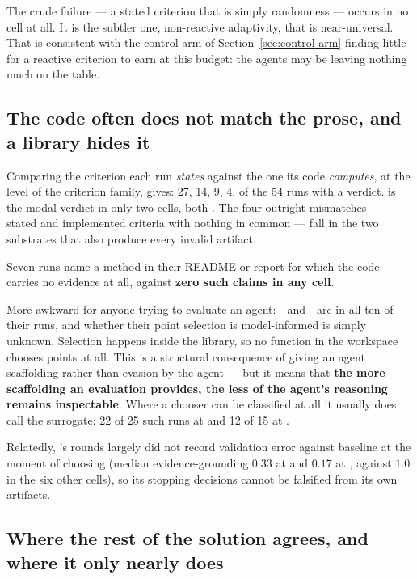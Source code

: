 The crude failure --- a stated criterion that is simply randomness --- occurs in
no cell at all. It is the subtler one, non-reactive adaptivity, that is
near-universal. That is consistent with the control arm of
Section~\ref{sec:control-arm} finding little for a reactive criterion to earn at
this budget: the agents may be leaving nothing much on the table.

\subsection{The code often does not match the prose, and a library hides it}

Comparing the criterion each run \emph{states} against the one its code
\emph{computes}, at the level of the criterion family, gives:  27,
 14,  9,  4, of the 54
runs with a verdict.  is the modal verdict in only two cells, both
\Lthree{}. The four outright mismatches --- stated and implemented criteria with
nothing in common --- fall in the two substrates that also produce every invalid
artifact.

Seven \Ltwo{} runs name a method in their README or report for which the code
carries no evidence at all, against \textbf{zero such claims in any \Lthree{}
cell}.

More awkward for anyone trying to evaluate an agent: \Ltwo{}- and
\Ltwo{}- are  in all ten of their runs,
and whether their point selection is model-informed is simply unknown. Selection
happens inside the library, so no function in the workspace chooses points at
all. This is a structural consequence of giving an agent scaffolding rather than
evasion by the agent --- but it means that \textbf{the more scaffolding an
evaluation provides, the less of the agent's reasoning remains inspectable}.
Where a chooser can be classified at all it usually does call the surrogate: 22
of 25 such runs at \Lthree{} and 12 of 15 at \Ltwo{}.

Relatedly, 's rounds largely did not record validation error against
baseline at the moment of choosing (median evidence-grounding $0.33$ at \Ltwo{}
and $0.17$ at \Lthree{}, against $1.0$ in the six other cells), so its stopping
decisions cannot be falsified from its own artifacts.

\subsection{Where the rest of the solution agrees, and where it only nearly does}

